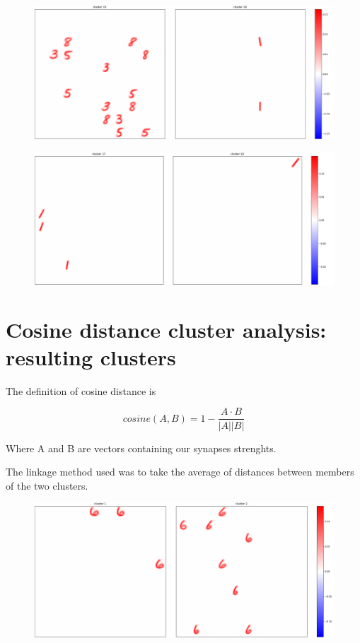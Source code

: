 \documentclass[a4paper]{report}
\begin{document}
\begin{figure} [H]
	\centering
	\includegraphics [width=\textwidth ] {c/e/15.png}
	\caption{}
\end{figure}

\begin{figure} [H]
	\centering
	\includegraphics [width=\textwidth ] {c/e/17.png}
	\caption{}
\end{figure}

\chapter{Cosine distance cluster analysis: resulting clusters}

The definition of cosine distance is

\begin{equation}
    cosine(A,B) = 1 - \frac{A \cdot B}{|A||B|}
\end{equation}

Where A and B are vectors containing our synapses strenghts.

The linkage method used was to take the average of distances between members of the two clusters.

\begin{figure} [H]
    \centering
    \includegraphics [width=\textwidth ] {c/c/1.png}
    \caption{}
\end{figure}
\end{document}

